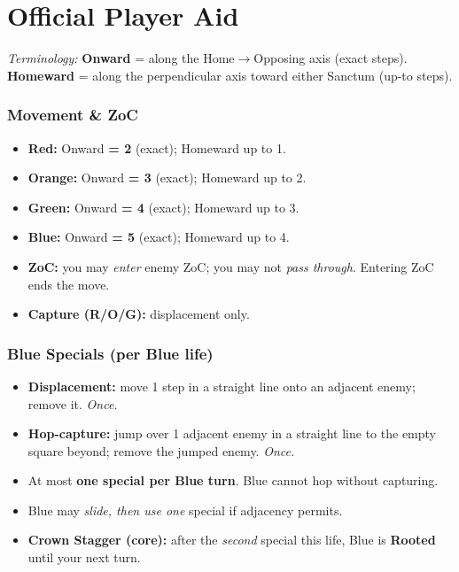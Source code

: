 \documentclass[11pt]{article}
\begin{document}
\clearpage
\appendix
\section{Official Player Aid}
\label{sec:playeraide}


\noindent\footnotesize\emph{Terminology:} \textbf{Onward} = along the Home$\to$Opposing axis (exact steps). \textbf{Homeward} = along the perpendicular axis toward either Sanctum (up-to steps).\normalsize


\begin{multicols}{2}
\subsubsection*{Movement \& ZoC}
\begin{itemize}[leftmargin=1.1em,itemsep=0.2em]
  \item \textbf{Red:} Onward \textbf{= 2} (exact); Homeward up to 1.
  \item \textbf{Orange:} Onward \textbf{= 3} (exact); Homeward up to 2.
  \item \textbf{Green:} Onward \textbf{= 4} (exact); Homeward up to 3.
  \item \textbf{Blue:} Onward \textbf{= 5} (exact); Homeward up to 4.
  \item \textbf{ZoC:} you may \emph{enter} enemy ZoC; you may not \emph{pass through}. Entering ZoC ends the move.
  \item \textbf{Capture (R/O/G):} displacement only.
\end{itemize}

\subsubsection*{Blue Specials (per Blue life)}
\begin{itemize}[leftmargin=1.1em,itemsep=0.2em]
  \item \textbf{Displacement:} move 1 step in a straight line onto an adjacent enemy; remove it. \emph{Once.}
  \item \textbf{Hop-capture:} jump over 1 adjacent enemy in a straight line to the empty square beyond; remove the jumped enemy. \emph{Once.}
  \item At most \textbf{one special per Blue turn}. Blue cannot hop without capturing.
  \item Blue may \emph{slide, then use one} special if adjacency permits.
  \item \textbf{Crown Stagger (core):} after the \emph{second} special this life, Blue is \textbf{Rooted} until your next turn.
\end{itemize}


\end{multicols}
\end{document}
